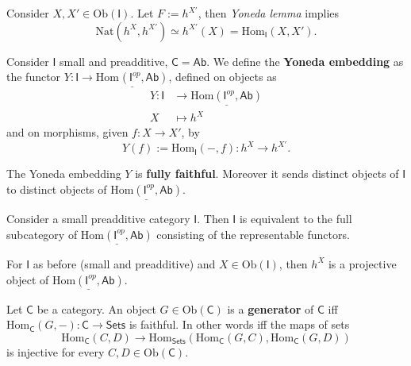 \begin{rem}
	Consider $X, X' \in \mathrm{Ob} \left(\mathsf{I}\right)$. 
	Let $F := h^{X'}$, then \textit{Yoneda lemma} implies
	\begin{equation}
		\mathrm{Nat} \left( h^X, h^{X'} \right) \simeq h^{X'}(X) = \mathrm{Hom}_{\mathsf{I}} \left( X, X' \right)
	.\end{equation} 
\end{rem}

\begin{defn}
	Consider $\mathsf{I}$ small and preadditive, $\mathsf{C} = \mathsf{Ab}$.
	We define the \textbf{Yoneda embedding} as the functor
	$Y: \mathsf{I} \to \underline{\mathrm{Hom}_{\mathsf{}} \left( \mathsf{I}^{op}, \mathsf{Ab} \right)}$,
	defined on objects as
	\begin{align}
	Y: \mathsf{I} &\to \underline{\mathrm{Hom} \left( \mathsf{I}^{op}, \mathsf{Ab} \right)} \\
		X &\mapsto h^X
	\end{align} 
	and on morphisms, given $f: X \to X'$, by
	\begin{equation}
		Y(f):= \mathrm{Hom}_{\mathsf{I}} \left( -, f \right): h^X \to h^{X'}
	.\end{equation} 
\end{defn}

\begin{prop}
	The Yoneda embedding $Y$ is \textbf{fully faithful}.
	Moreover it sends distinct objects of $\mathsf{I}$ to distinct objects of
	$\underline{\mathrm{Hom}\left( \mathsf{I}^{op}, \mathsf{Ab} \right)}$.
\end{prop} 

\begin{cor}
	Consider a small preadditive category $\mathsf{I}$.
	Then $\mathsf{I}$ is equivalent to the full subcategory of
	$\underline{\mathrm{Hom}\left( \mathsf{I}^{op}, \mathsf{Ab} \right)}$ 
	consisting of the representable functors.
\end{cor} 

\begin{prop}
	For $\mathsf{I}$ as before (small and preadditive) and
	$X \in \mathrm{Ob} \left(\mathsf{I}\right)$, then
	$h^X$ is a projective object of 
	$\underline{\mathrm{Hom} \left( \mathsf{I}^{op}, \mathsf{Ab} \right)}$.
\end{prop} 

\begin{defn}
	Let $\mathsf{C}$ be a category.
	An object $G \in \mathrm{Ob} \left(\mathsf{C}\right)$ is a \textbf{generator} of $\mathsf{C}$ iff
	$\mathrm{Hom}_{\mathsf{C}} \left( G, - \right): \mathsf{C} \to \mathsf{Sets}$ is faithful.
	In other words iff the maps of sets
	 \begin{equation}
	\mathrm{Hom}_{\mathsf{C}} \left( C, D \right) \to
	\mathrm{Hom}_{\mathsf{Sets}} \left( \mathrm{Hom}_{\mathsf{C}} \left( G, C \right), 
	\mathrm{Hom}_{\mathsf{C}} \left( G, D \right) \right)
	\end{equation} 
	is injective for every $C, D \in \mathrm{Ob} \left(\mathsf{C}\right)$.
\end{defn}

